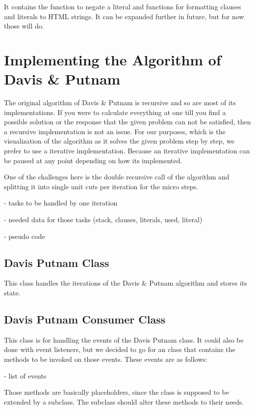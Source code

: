 It contains the function to negate a literal and functions for formatting clauses and literals to HTML strings. It can be expanded further in future, but for now those will do.

\section{Implementing the Algorithm of Davis \& Putnam}
\label{sec:impDavisPutnam}
The original algorithm of Davis \& Putnam is recursive and so are most of its implementations. If you were to calculate everything at one till you find a possible solution or the response that the given problem can not be satisfied, then a recursive implementation is not an issue. For our purposes, which is the visualization of the algorithm as it solves the given problem step by step, we prefer to use a iterative implementation. Because an iterative implementation can be paused at any point depending on how its implemented.

One of the challenges here is the double recursive call of the algorithm and splitting it into single unit cuts per iteration for the micro steps.

- tasks to be handled by one iteration

- needed data for those tasks (stack, clauses, literals, used, literal)

- pseudo code

\subsection{Davis Putnam Class}
\label{sub:impDavisPutnam}
This class handles the iterations of the Davis \& Putnam algorithm and stores its state.



\subsection{Davis Putnam Consumer Class}
\label{sub:impDavisPutnamConsumer}
This class is for handling the events of the Davis Putnam class. It could also be done with event listeners, but we decided to go for an class that contains the methods to be invoked on those events. These events are as follows:

- list of events

Those methods are basically placeholders, since the class is supposed to be extended by a subclass. The subclass should alter these methods to their needs.

